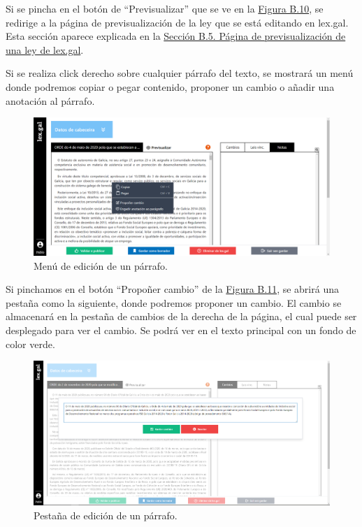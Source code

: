 Si se pincha en el botón de ``Previsualizar'' que se ve en la \hyperref[enlaceCabeceraLexGal]{Figura B.10}, se redirige a la página de previsualización de la ley que se está editando en lex.gal. Esta sección aparece explicada en la \hyperref[PPrevisualizacionLexGal]{Sección B.5. Página de previsualización de una ley de lex.gal}.

Si se realiza click derecho sobre cualquier párrafo del texto, se mostrará un menú donde podremos copiar o pegar contenido, proponer un cambio o añadir una anotación al párrafo.

\begin{figure}[H]
\centerline{\includegraphics[width=12cm]{figuras/manualUsuario/EditarContextMenu.PNG}}
\caption{Menú de edición de un párrafo.}
\label{enlaceContextMenuLexGal}
\end{figure}

Si pinchamos en el botón ``Propoñer cambio'' de la \hyperref[enlaceContextMenuLexGal]{Figura B.11}, se abrirá una pestaña como la siguiente, donde podremos proponer un cambio. El cambio se almacenará en la pestaña de cambios de la derecha de la página, el cual puede ser desplegado para ver el cambio. Se podrá ver en el texto principal con un fondo de color verde.

\begin{figure}[H]
\centerline{\includegraphics[width=12cm]{figuras/manualUsuario/Cambios.PNG}}
\caption{Pestaña de edición de un párrafo.}
\label{enlaceCambios}
\end{figure}


